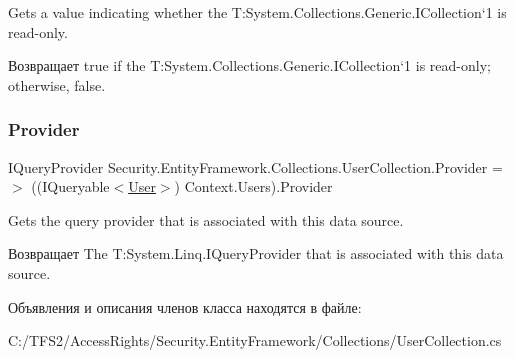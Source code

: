 Gets a value indicating whether the T\+:\+System.\+Collections.\+Generic.\+I\+Collection`1 is read-\/only. 

\begin{DoxyReturn}{Возвращает}
true if the T\+:\+System.\+Collections.\+Generic.\+I\+Collection`1 is read-\/only; otherwise, false. 
\end{DoxyReturn}
\mbox{\label{class_security_1_1_entity_framework_1_1_collections_1_1_user_collection_ac14ccfbf6bb46ddac76cddc5fd82e427}} 
\subsubsection{\texorpdfstring{Provider}{Provider}}
{\footnotesize\ttfamily I\+Query\+Provider Security.\+Entity\+Framework.\+Collections.\+User\+Collection.\+Provider =$>$ ((I\+Queryable$<$\hyperlink{class_security_1_1_model_1_1_user}{User}$>$) Context.\+Users).Provider}



Gets the query provider that is associated with this data source. 

\begin{DoxyReturn}{Возвращает}
The T\+:\+System.\+Linq.\+I\+Query\+Provider that is associated with this data source. 
\end{DoxyReturn}


Объявления и описания членов класса находятся в файле\+:\begin{DoxyCompactItemize}
\item 
C\+:/\+T\+F\+S2/\+Access\+Rights/\+Security.\+Entity\+Framework/\+Collections/User\+Collection.\+cs\end{DoxyCompactItemize}
